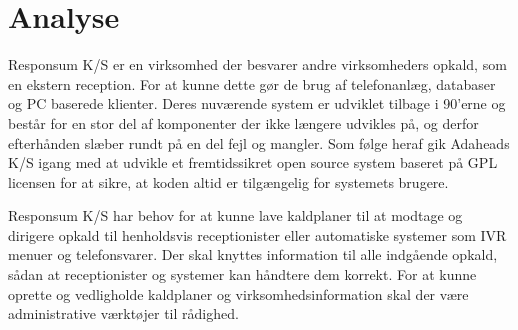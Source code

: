 \chapter{Analyse}

Responsum K/S er en virksomhed der besvarer andre virksomheders opkald, som en ekstern reception. For at kunne dette gør de brug af telefonanlæg, databaser og PC baserede klienter. Deres nuværende system er udviklet tilbage i 90'erne og består for en stor del af komponenter der ikke længere udvikles på, og derfor efterhånden slæber rundt på en del fejl og mangler. Som følge heraf gik Adaheads K/S igang med at udvikle et fremtidssikret open source system baseret på GPL licensen for at sikre, at koden altid er tilgængelig for systemets brugere.

Responsum K/S har behov for at kunne lave kaldplaner til at modtage og dirigere opkald til henholdsvis receptionister eller automatiske systemer som IVR menuer og telefonsvarer. Der skal knyttes information til alle indgående opkald, sådan at receptionister og systemer kan håndtere dem korrekt. For at kunne oprette og vedligholde kaldplaner og virksomhedsinformation skal der være administrative værktøjer til rådighed.

\pagebreak

